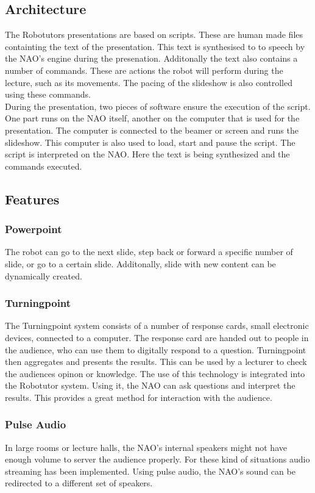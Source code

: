 \subsection{Architecture}
The Robotutors presentations are based on scripts. These are human made files containting the text of the presentation. This text is synthesised to to speech by the NAO's engine during the presenation. Additonally the text also contains a number of commands. These are actions the robot will perform during the lecture, such as its movements. The pacing of the slideshow is also controlled using these commands.\\
During the presentation, two pieces of software ensure the execution of the script. One part runs on the NAO itself, another on the computer that is used for the presentation. The computer is connected to the beamer or screen and runs the slideshow. This computer is also used to load, start and pause the script. The script is interpreted on the NAO. Here the text is being synthesized and the commands executed.


\subsection{Features}
\subsubsection{Powerpoint}
The robot can go to the next slide, step back or forward a specific number of slide, or go to a certain slide. Additonally, slide with new content can be dynamically created.

\subsubsection{Turningpoint}
The Turningpoint system consists of a number of response cards, small electronic devices, connected to a computer. The response card are handed out to people in the audience, who can use them to digitally respond to a question. Turningpoint then aggregates and presents the results. This can be used by a lecturer to check the audiences opinon or knowledge. The use of this technology is integrated into the Robotutor system. Using it, the NAO can ask questions and interpret the results. This provides a great method for interaction with the audience.

\subsubsection{Pulse Audio}
In large rooms or lecture halls, the NAO's internal speakers might not have enough volume to server the audience properly. For these kind of situations audio streaming has been implemented. Using pulse audio, the NAO's sound can be redirected to a different set of speakers.
